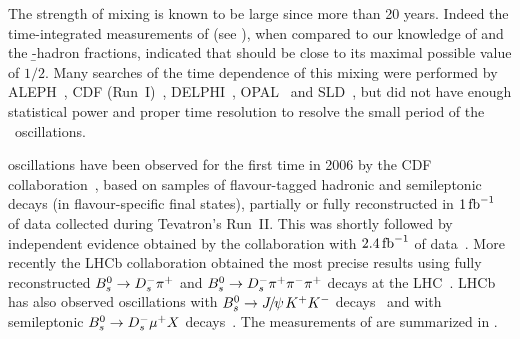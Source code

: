  

 


The strength of \Bs mixing is known to be large since more than 20 years. 
Indeed the time-integrated measurements of \chibar (see ),
when compared to our knowledge
of \chid and the \b-hadron fractions, indicated that 
\chis should be close to its maximal possible value of $1/2$.
Many searches of the time dependence of this mixing 
were performed by ALEPH~\cite{Heister:2002gk},
CDF (Run~I)~\cite{Abe:1998qj},
DELPHI~\cite{Abreu:2000sh,Abreu:2000ev,Abdallah:2002mr,Abdallah:2003we},
OPAL~\cite{Abbiendi:1999gm,Abbiendi:2000bh} and
SLD~\cite{Abe:2002ua,Abe:2002wfa,Abe:2000gp},
but did not have enough statistical power
and proper time resolution to resolve 
the small period of the \Bs\ oscillations.

\Bs oscillations have been observed for the first time in 2006
by the CDF collaboration~\cite{Abulencia:2006ze,*Abulencia:2006mq_mod_cont},
based on samples of flavour-tagged hadronic and semileptonic \Bs decays
(in flavour-specific final states), partially or fully reconstructed in 
$1\mbox{\,fb}^{-1}$ of data collected during Tevatron's Run~II. 
This was shortly followed by independent evidence obtained by the \dzero collaboration
with $2.4\mbox{\,fb}^{-1}$ of
data~\cite{D0note5618:2008,*D0note5474:2007,*D0note5254:2006,*Abazov:2006dm_mod_cont}.
More recently the LHCb collaboration obtained the most precise results using fully reconstructed 
$B^0_s \to D_s^-\pi^+$ and $B^0_s \to D_s^-\pi^+\pi^-\pi^+$ decays at the 
LHC~\cite{Aaij:2011qx,Aaij:2013mpa}.
LHCb has also observed \Bs oscillations with 
$B^0_s\to{J\mskip -3mu/\mskip -2mu\psi\mskip 2mu} K^+K^-$ decays~\cite{Aaij:2014zsa,*Aaij:2013oba_supersede2}
and with semileptonic $B^0_s \to D_s^-\mu^+ X$ decays~\cite{Aaij:2013gja}.
The measurements of \dms are summarized in . 

